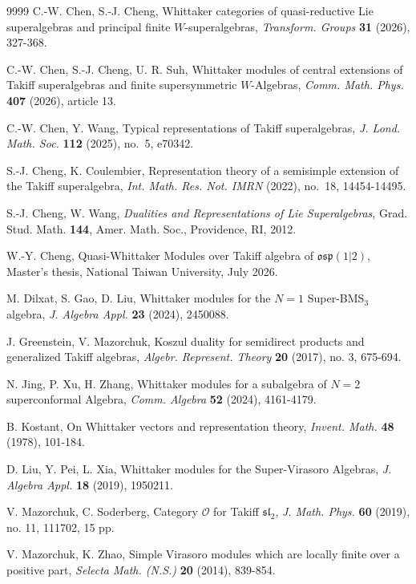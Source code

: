 \documentclass[a4paper,10pt]{article}
\theoremstyle{definition}
\theoremstyle{plain}
\theoremstyle{remark}
\theoremstyle{mystyle}
\numberwithin{equation}{section}
\begin{document}
\begin{thebibliography}{9999}
 C.-W. Chen, S.-J. Cheng, Whittaker categories of quasi-reductive Lie superalgebras and principal finite $W$-superalgebras, {\it Transform. Groups} {\bf 31} (2026), 327-368.

 C.-W. Chen, S.-J. Cheng, U. R. Suh, Whittaker modules of central extensions of Takiff superalgebras and finite supersymmetric $W$-Algebras, {\it Comm. Math. Phys.} {\bf407} (2026), article 13.
    
 C.-W. Chen, Y. Wang, Typical representations of Takiff superalgebras, {\it J. Lond. Math. Soc.} {\bf 112} (2025), no.~5, e70342.


 S.-J. Cheng, K. Coulembier, Representation theory of a semisimple extension of the Takiff superalgebra, {\it Int. Math. Res. Not. IMRN} (2022), no.~18, 14454-14495.

 S.-J. Cheng, W. Wang, {\it Dualities and Representations of Lie Superalgebras}, Grad. Stud. Math. {\bf 144}, Amer. Math. Soc., Providence, RI, 2012.

 W.-Y. Cheng, Quasi-Whittaker Modules over Takiff algebra of $\mathfrak{osp}(1|2)$, Master’s thesis, National Taiwan University, July 2026.

 M. Dilxat, S. Gao, D. Liu, Whittaker modules for the $N=1$ Super-BMS$_3$ algebra, {\it J. Algebra Appl.} {\bf23} (2024), 2450088.

 J. Greenstein, V. Mazorchuk, Koszul duality for semidirect products and generalized Takiff algebras, {\it Algebr. Represent. Theory} {\bf 20} (2017), no. 3, 675-694.

 N. Jing, P. Xu, H. Zhang, Whittaker modules for a subalgebra of $N=2$ superconformal Algebra, {\it Comm. Algebra} {\bf52} (2024), 4161-4179.

 B. Kostant, On Whittaker vectors and representation theory, {\it Invent. Math.} {\bf48} (1978), 101-184.

 D. Liu, Y. Pei, L. Xia, Whittaker modules for the Super-Virasoro Algebras, {\it
J. Algebra Appl.} {\bf18} (2019), 1950211.

 V. Mazorchuk, C. Soderberg, Category $\mathcal{O}$ for Takiff $\mathfrak{sl}_2$, {\it J. Math. Phys.} {\bf 60} (2019), no. 11, 111702, 15 pp.
    
 V. Mazorchuk, K. Zhao, Simple Virasoro modules which are locally finite over a positive part, {\it Selecta Math. (N.S.)} {\bf 20} (2014), 839-854. 


\end{thebibliography}
\end{document}
